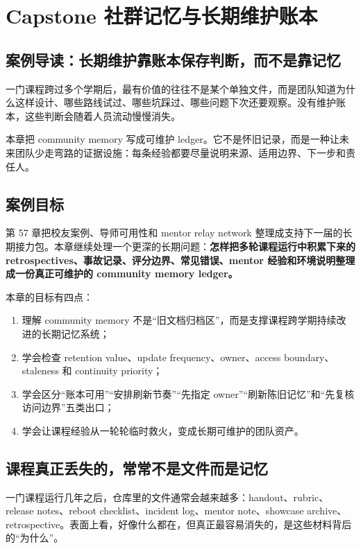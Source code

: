 \chapter{Capstone 社群记忆与长期维护账本}

\section{案例导读：长期维护靠账本保存判断，而不是靠记忆}

一门课程跨过多个学期后，最有价值的往往不是某个单独文件，而是团队知道为什么这样设计、哪些路线试过、哪些坑踩过、哪些问题下次还要观察。没有维护账本，这些判断会随着人员流动慢慢消失。

本章把 community memory 写成可维护 ledger。它不是怀旧记录，而是一种让未来团队少走弯路的证据设施：每条经验都要尽量说明来源、适用边界、下一步和责任人。

\section{案例目标}

第 57 章把校友案例、导师可用性和 mentor relay network 整理成支持下一届的长期接力包。本章继续处理一个更深的长期问题：\textbf{怎样把多轮课程运行中积累下来的 retrospectives、事故记录、评分边界、常见错误、mentor 经验和环境说明整理成一份真正可维护的 community memory ledger。}

本章的目标有四点：

\begin{enumerate}
    \item 理解 community memory 不是“旧文档归档区”，而是支撑课程跨学期持续改进的长期记忆系统；
    \item 学会检查 retention value、update frequency、owner、access boundary、staleness 和 continuity priority；
    \item 学会区分“账本可用”“安排刷新节奏”“先指定 owner”“刷新陈旧记忆”和“先复核访问边界”五类出口；
    \item 学会让课程经验从一轮轮临时救火，变成长期可维护的团队资产。
\end{enumerate}

\section{课程真正丢失的，常常不是文件而是记忆}

一门课程运行几年之后，仓库里的文件通常会越来越多：handout、rubric、release notes、reboot checklist、incident log、mentor note、showcase archive、retrospective。表面上看，好像什么都在，但真正最容易消失的，是这些材料背后的“为什么”。

